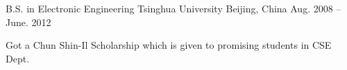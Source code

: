 

\begin{cventries}

  \cventry
  {B.S. in Electronic Engineering}
  {Tsinghua University}
  {Beijing, China}
  {Aug. 2008 -- June. 2012}
  {
    \begin{cvitems} %
    \item {Got a Chun Shin-Il Scholarship which is given to promising students in CSE Dept.}
    \end{cvitems}
  }


\end{cventries}
